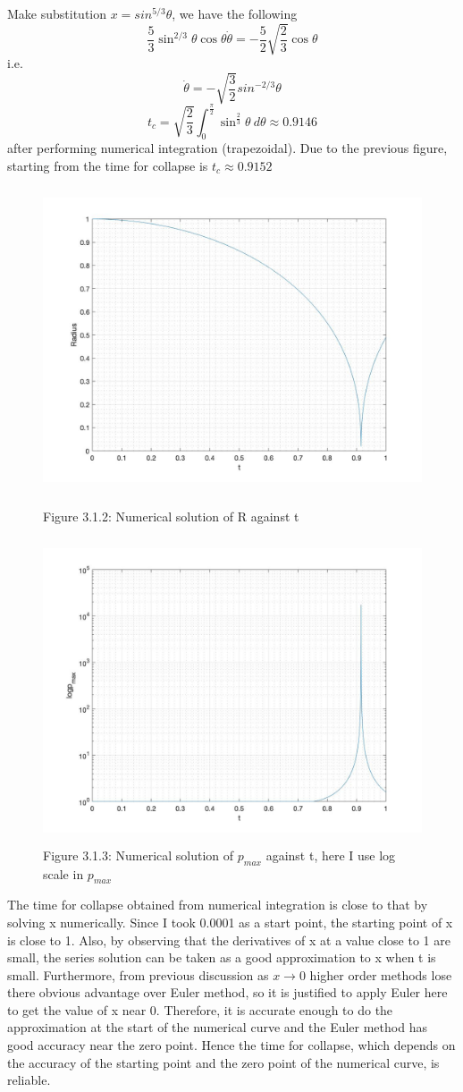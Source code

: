 \documentclass[11pt]{article}
\begin{document}
Make substitution $x = sin^{5/3}\theta$, we have the following $$\frac{5}{3}\sin^{2/3}\theta \cos\theta \dot{\theta} = -\frac{5}{2}\sqrt{\frac{2}{3}}\cos\theta $$ i.e.
$$\dot{\theta} = -\sqrt{\frac{3}{2}}sin^{-2/3}\theta$$
$$t_{c} = \sqrt{\frac{2}{3}}\int_{0}^{\frac{\pi}{2}}\sin^{\frac{2}{3}}\theta\ d\theta \approx 0.9146 $$
after performing numerical integration (trapezoidal). 
Due to the previous figure, starting from the time for collapse is $t_{c} \approx 0.9152$
\begin{figure}[H]
\includegraphics[width = 12cm, height = 9cm]{Q3(1).jpg}
\caption{Figure 3.1.2: Numerical solution of R against t}
\includegraphics[width = 12cm, height = 9cm]{Q3(2).jpg}
\caption{Figure 3.1.3: Numerical solution of $p_{max}$ against t, here I use log scale in $p_{max}$}
\end{figure}
The time for collapse obtained from numerical integration is close to that by solving x numerically. Since I took 0.0001 as a start point, the starting point of x is close to 1. Also, by observing that the derivatives of x at a value close to 1 are small, the series solution can be taken as a good approximation to x when t is small. Furthermore, from previous discussion as $x \to 0$ higher order methods lose there obvious advantage over Euler method, so it is justified to apply Euler here to get the value of x near 0. Therefore, it is accurate enough to do the approximation at the start of the numerical curve and the Euler method has good accuracy near the zero point. Hence the time for collapse, which depends on the accuracy of the starting point and the zero point of the numerical curve, is reliable.
\end{document}
